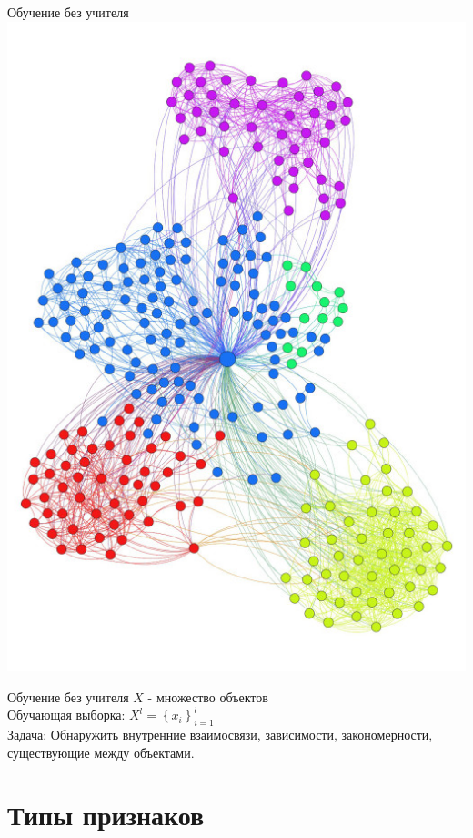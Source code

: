 \documentclass[10pt]{beamer}
\begin{document}
{
\begin{frame}{Обучение без учителя}
  \centering
  \includegraphics[width=0.9 \linewidth, height=0.9 \textheight, keepaspectratio]{images/clustering}\\
\end{frame}
}


{
\begin{frame}{Обучение без учителя}
  $X$ - множество объектов \\
	Обучающая выборка: ${X^l = \left\{x_i\right\}_{i=1}^l}$ \\ 
	\bigbreak
	\bigbreak
	\alert{Задача}: Обнаружить внутренние взаимосвязи, зависимости, закономерности, существующие между объектами.
\end{frame}
}

\section{Типы признаков}
\end{document}
